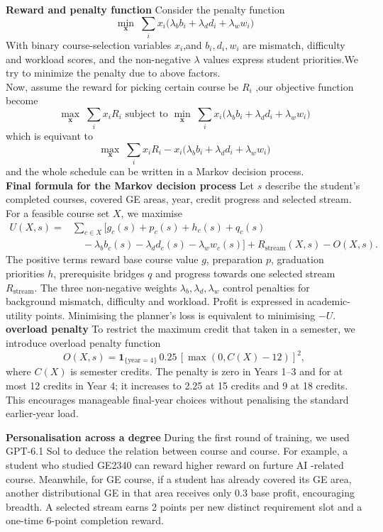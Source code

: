 \documentclass{article}
\begin{document}
\newpage
\textbf{Reward and penalty function } 
Consider the penalty function 
\[
  \min_{\mathbf{x}}\;\sum_i x_i
  \bigl(\lambda_b b_i+\lambda_d d_i+\lambda_w w_i\bigr)
 \]
With binary course-selection variables $x_i$,and $b_i,d_i,w_i$ are mismatch, difficulty and workload scores, and the non-negative $\lambda$ values express student priorities.We try to minimize the penalty due to above factors.\\
Now, assume the reward for picking certain course be $R_i$ ,our objective function become 
\[\max_{\mathbf{x}}\;\sum_i x_iR_i \text{ subject to }\min_{\mathbf{x}}\;\sum_i x_i
  \bigl(\lambda_b b_i+\lambda_d d_i+\lambda_w w_i\bigr)\]
which is equivant to
\[\max_{\mathbf{x}}\;\sum_i x_iR_i  -x_i
  \bigl(\lambda_b b_i+\lambda_d d_i+\lambda_w w_i\bigr)\]
and the whole schedule can be written in a Markov decision process.\\
\textbf{Final formula for the Markov decision process}
Let $s$ describe the student's completed courses, covered GE areas, year, credit progress and selected stream. For a feasible course set $X$, we maximise
\begin{align}
U(X,s)={}&\sum_{c\in X}\bigl[g_c(s)+p_c(s)+h_c(s)+q_c(s)\nonumber\\
&\quad-\lambda_b b_c(s)-\lambda_d d_c(s)-\lambda_w w_c(s)\bigr]
+R_{\mathrm{stream}}(X,s)-O(X,s). \label{eq:utility}
\end{align}
The positive terms reward base course value $g$, preparation $p$, graduation priorities $h$, prerequisite bridges $q$ and progress towards one selected stream $R_{\mathrm{stream}}$. The three non-negative weights $\lambda_b,\lambda_d,\lambda_w$ control penalties for background mismatch, difficulty and workload. Profit is expressed in academic-utility points. Minimising the planner's loss is equivalent to minimising $-U$.
\\\textbf{overload penalty} To restrict the maximum credit that taken in a semester, we introduce overload penalty function
\begin{equation}
O(X,s)=\mathbf{1}_{\{\mathrm{year}=4\}}\,0.25\,[\max(0,C(X)-12)]^2,
\end{equation}
where $C(X)$ is semester credits. The penalty is zero in Years 1--3 and for at most 12 credits in Year 4; it increases to 2.25 at 15 credits and 9 at 18 credits. This encourages manageable final-year choices without penalising the standard earlier-year load.

\textbf{Personalisation across a degree} During the first round of training, we used GPT-6.1 Sol to deduce the relation between course and course. For example, a student who studied GE2340 can reward higher reward on furture AI -related course. Meanwhile, for GE course, if a student has already
covered its GE area, another distributional GE in that area receives only 0.3 base profit, encouraging breadth. A selected stream earns 2 points per new distinct requirement slot and a one-time 6-point completion reward. 
\end{document}
